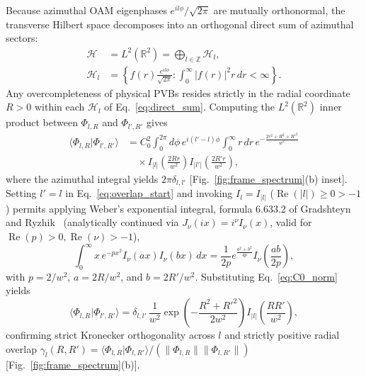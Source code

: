 \documentclass[aps,pra,onecolumn,notitlepage,11pt,tightenlines,amsmath,amssymb,floatfix,longbibliography]{revtex4-2}
\providecommand{\braket}[2]{\langle#1\vert#2\rangle}
\providecommand{\abs}[1]{\lvert#1\rvert}
\providecommand{\norm}[1]{\lVert#1\rVert}
\begin{document}
Because azimuthal OAM eigenphases $e^{il\phi}/\sqrt{2\pi}$ are mutually orthonormal, the transverse Hilbert space decomposes into an orthogonal direct sum of azimuthal sectors:
\begin{align}
\mathcal{H} &= L^2(\mathbb{R}^2) = \bigoplus_{l\in\mathbb{Z}} \mathcal{H}_l, \nonumber \\
\mathcal{H}_l &= \left\{ f(r)\frac{e^{il\phi}}{\sqrt{2\pi}} : \int_0^\infty \abs{f(r)}^2 r\,dr < \infty \right\}.
\label{eq:direct_sum}
\end{align}
Any overcompleteness of physical PVBs resides strictly in the radial coordinate $R > 0$ within each $\mathcal{H}_l$ of Eq.~\eqref{eq:direct_sum}. Computing the $L^2(\mathbb{R}^2)$ inner product between $\Phi_{l,R}$ and $\Phi_{l',R'}$ gives
\begin{align}
\braket{\Phi_{l,R}}{\Phi_{l',R'}} &= C_0^2 \int_0^{2\pi} d\phi\, e^{i(l'-l)\phi} \int_0^\infty r\,dr\, e^{-\frac{2r^2+R^2+R'^2}{w^2}} \nonumber \\
&\quad \times I_{\lvert l\rvert}\!\left(\frac{2Rr}{w^2}\right) I_{\lvert l'\rvert}\!\left(\frac{2R'r}{w^2}\right),
\label{eq:overlap_start}
\end{align}
where the azimuthal integral yields $2\pi\delta_{l,l'}$ [Fig.~\ref{fig:frame_spectrum}(b) inset]. Setting $l'=l$ in Eq.~\eqref{eq:overlap_start} and invoking $I_l = I_{\abs{l}}$ ($\operatorname{Re}(\abs{l}) \ge 0 > -1$) permits applying Weber's exponential integral, formula 6.633.2 of Gradshteyn and Ryzhik~\cite{Gradshteyn2014} (analytically continued via $J_\nu(ix)=i^\nu I_\nu(x)$, valid for $\operatorname{Re}(p)>0, \operatorname{Re}(\nu)>-1$),
\begin{equation}
\int_0^\infty x\, e^{-px^2} I_\nu(ax) I_\nu(bx)\,dx = \frac{1}{2p} e^{\frac{a^2+b^2}{4p}} I_\nu\!\left(\frac{ab}{2p}\right),
\label{eq:weber_identity}
\end{equation}
with $p = 2/w^2$, $a = 2R/w^2$, and $b = 2R'/w^2$. Substituting Eq.~\eqref{eq:C0_norm} yields
\begin{equation}
\braket{\Phi_{l,R}}{\Phi_{l',R'}} = \delta_{l,l'}\,\frac{1}{w^2}\exp\!\left(-\frac{R^2 + R'^2}{2w^2}\right) I_{\abs{l}}\!\left(\frac{RR'}{w^2}\right),
\label{eq:overlap_closed}
\end{equation}
confirming strict Kronecker orthogonality across $l$ and strictly positive radial overlap $\gamma_l(R,R') = \braket{\Phi_{l,R}}{\Phi_{l,R'}}/\allowbreak(\norm{\Phi_{l,R}}\norm{\Phi_{l,R'}})$ [Fig.~\ref{fig:frame_spectrum}(b)].
\end{document}
